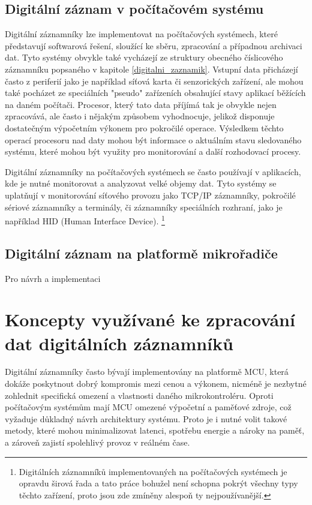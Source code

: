 \subsection{Digitální záznam v počítačovém systému}
Digitální záznamníky lze implementovat na počítačových systémech, které představují softwarová řešení, sloužící ke sběru, 
zpracování a případnou archivaci dat. Tyto systémy obvykle také vycházejí ze struktury obecného číslicového záznamníku popsaného 
v kapitole \ref{digitalni_zaznamik}. Vstupní data přicházejí často z periferií jako je například síťová karta či senzorických 
zařízení, ale mohou také pocházet ze speciálních "pseudo" zařízeních obsahující stavy aplikací běžících na daném počítači. 
Procesor, který tato data příjímá tak je obvykle nejen zpracovává, ale často i nějakým způsobem vyhodnocuje, jelikož disponuje 
dostatečným výpočetním výkonem pro pokročilé operace. Výsledkem těchto operací procesoru nad daty mohou být informace o aktuálním 
stavu sledovaného systému, které mohou být využity pro monitorování a další rozhodovací procesy. 
\cite{linux_in_action_log_and_monitoring}

Digitální záznamníky na počítačových systémech se často používají v aplikacích, kde je nutné monitorovat a analyzovat velké 
objemy dat. Tyto systémy se uplatňují v monitorování síťového provozu jako TCP/IP záznamníky, pokročilé sériové záznamníky 
a terminály, či záznamníky speciálních rozhraní, jako je například HID (Human Interface Device). \footnote{Digitálních záznamníků 
implementovaných na počítačových systémech je opravdu širová řada a tato práce bohužel není schopna pokrýt všechny typy těchto 
zařízení, proto jsou zde zmíněny alespoň ty nejpoužívanější.}  



\subsection{Digitální záznam na platformě mikrořadiče}
Pro návrh a implementaci 

\section{Koncepty využívané ke zpracování dat digitálních záznamníků} 
Digitální záznamníky často bývají implementovány na platformě MCU, která dokáže poskytnout dobrý kompromis mezi cenou a výkonem, 
nicméně je nezbytné zohlednit specifická omezení a vlastnosti daného mikrokontroléru. Oproti počítačovým systémům mají MCU omezené 
výpočetní a paměťové zdroje, což vyžaduje důkladný návrh architektury systému. Proto je i nutné volit takové metody, které mohou 
minimalizovat latenci, spotřebu energie a nároky na paměť, a zároveň zajistí spolehlivý provoz v reálném čase.

